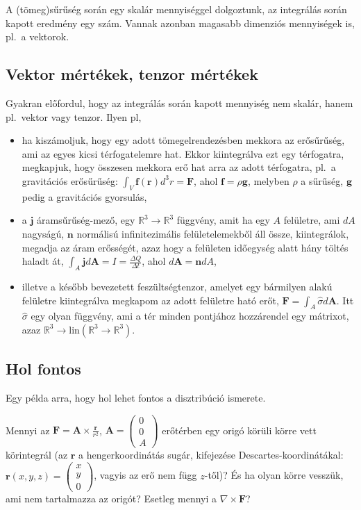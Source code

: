 \documentclass[12pt,a4paper]{scrartcl}
\let\mathbf\bm
\begin{document}
A (tömeg)sűrűség során egy skalár mennyiséggel dolgoztunk, az integrálás során kapott eredmény egy szám. Vannak azonban magasabb dimenziós mennyiségek is, pl.\ a vektorok.

\subsection{Vektor mértékek, tenzor mértékek}
Gyakran előfordul, hogy az integrálás során kapott mennyiség nem skalár, hanem pl.\ vektor vagy tenzor. Ilyen pl,
\begin{itemize}
\item ha kiszámoljuk, hogy egy adott tömegelrendezésben mekkora az erősűrűség, ami az egyes kicsi térfogatelemre hat. Ekkor kiintegrálva ezt egy térfogatra, megkapjuk, hogy összesen mekkora erő hat arra az adott térfogatra, pl.\ a gravitációs erősűrűség: $\int_V {{\mathbf{f}}\left( {\mathbf{r}} \right){d^3}r}  = {\mathbf{F}}$, ahol ${\mathbf{f}} = \rho {\mathbf{g}}$, melyben $\rho$ a sűrűség, ${\mathbf{g}}$ pedig a gravitációs gyorsulás,
\item a ${\mathbf{j}}$ áramsűrűség-mező, egy ${\mathbb{R}^3} \to {\mathbb{R}^3}$ függvény, amit ha egy $A$ felületre, ami $dA$ nagyságú, ${\mathbf{n}}$ normálisú infinitezimális felületelemekből áll össze, kiintegrálok, megadja az áram erősségét, azaz hogy a felületen időegység alatt hány töltés haladt át, $\int_A {\mathbf{j}} d{\mathbf{A}} = I = \frac{{\Delta Q}}{{\Delta t}}$, ahol $d{\mathbf{A}} = {\mathbf{n}}dA$,
\item illetve a később bevezetett feszültségtenzor, amelyet egy bármilyen alakú felületre kiintegrálva megkapom az adott felületre ható erőt, ${\mathbf{F}} = \int_A {\hat \sigma d{\mathbf{A}}} $. Itt $\hat \sigma$ egy olyan függvény, ami a tér minden pontjához hozzárendel egy mátrixot, azaz ${\mathbb{R}^3} \to {\text{lin}}\left( {{\mathbb{R}^3} \to {\mathbb{R}^3}} \right)$.
\end{itemize}

\subsection{Hol fontos}
Egy példa arra, hogy hol lehet fontos a disztribúció ismerete.

Mennyi az ${\mathbf{F}} = {\mathbf{A}} \times \frac{{\mathbf{r}}}{{{r^2}}}$, ${\mathbf{A}} = \left( {\begin{array}{*{20}{c}}
  0 \\ 
  0 \\ 
  A 
\end{array}} \right)$ erőtérben egy origó körüli körre vett körintegrál (az ${\mathbf{r}}$ a hengerkoordinátás sugár, kifejezése Descartes-koordinátákal: ${\mathbf{r}}\left( {x,y,z} \right) = \left( {\begin{array}{*{20}{c}}
  x \\ 
  y \\ 
  0 
\end{array}} \right)$, vagyis az erő nem függ $z$-től)? És ha olyan körre vesszük, ami nem tartalmazza az origót? Esetleg mennyi a $\nabla  \times {\mathbf{F}}$?
\end{document}
